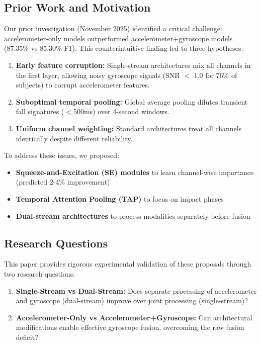 \documentclass{article}
\begin{document}
\subsection{Prior Work and Motivation}

Our prior investigation (November 2025) identified a critical challenge: accelerometer-only models outperformed accelerometer+gyroscope models (87.35\% vs 85.30\% F1). This counterintuitive finding led to three hypotheses:

\begin{enumerate}[label=\textbf{H\arabic*:}]
    \item \textbf{Early feature corruption:} Single-stream architectures mix all channels in the first layer, allowing noisy gyroscope signals (SNR $<$ 1.0 for 76\% of subjects) to corrupt accelerometer features.
    \item \textbf{Suboptimal temporal pooling:} Global average pooling dilutes transient fall signatures ($<$500ms) over 4-second windows.
    \item \textbf{Uniform channel weighting:} Standard architectures treat all channels identically despite different reliability.
\end{enumerate}

To address these issues, we proposed:
\begin{itemize}
    \item \textbf{Squeeze-and-Excitation (SE) modules} to learn channel-wise importance (predicted 2-4\% improvement)
    \item \textbf{Temporal Attention Pooling (TAP)} to focus on impact phases
    \item \textbf{Dual-stream architectures} to process modalities separately before fusion
\end{itemize}

\subsection{Research Questions}

This paper provides rigorous experimental validation of these proposals through two research questions:

\begin{enumerate}[label=\textbf{RQ\arabic*:}]
    \item \textbf{Single-Stream vs Dual-Stream:} Does separate processing of accelerometer and gyroscope (dual-stream) improve over joint processing (single-stream)?
    \item \textbf{Accelerometer-Only vs Accelerometer+Gyroscope:} Can architectural modifications enable effective gyroscope fusion, overcoming the raw fusion deficit?
\end{enumerate}
\end{document}
